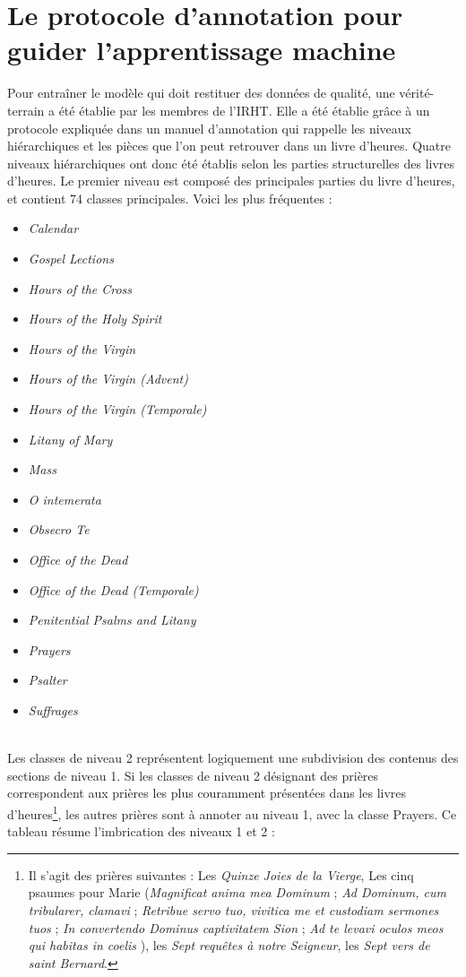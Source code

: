 \documentclass[a4paper,12pt,twoside]{book}
\begin{document}
	\section{\label{protocole_annotation}Le protocole d’annotation pour guider l’apprentissage machine}
	
	Pour entraîner le modèle qui doit restituer des données de qualité, une vérité-terrain a été établie par les membres de l'IRHT. Elle a été établie grâce à un protocole expliquée dans un manuel d'annotation qui rappelle les niveaux hiérarchiques et les pièces que l'on peut retrouver dans un livre d'heures. Quatre niveaux hiérarchiques ont donc été établis selon les parties structurelles des livres d'heures. Le premier niveau est composé des principales parties du livre d'heures, et contient 74 classes principales. Voici les plus fréquentes :
	\begin{itemize}
	    \item \textit{Calendar}
        \item \textit{Gospel Lections}
        \item \textit{Hours of the Cross}
        \item \textit{Hours of the Holy Spirit}
        \item \textit{Hours of the Virgin}
        \item \textit{Hours of the Virgin (Advent)}
        \item \textit{Hours of the Virgin (Temporale)}
        \item \textit{Litany of Mary}
        \item \textit{Mass}
        \item \textit{O intemerata}
        \item \textit{Obsecro Te}
        \item \textit{Office of the Dead}
        \item \textit{Office of the Dead (Temporale)}
        \item \textit{Penitential Psalms and Litany}
        \item \textit{Prayers}
        \item \textit{Psalter}
        \item \textit{Suffrages}
	\end{itemize} 
	\\
	
	
	Les classes de niveau 2 représentent logiquement une subdivision des contenus des sections de niveau 1. Si les classes de niveau 2 désignant des prières correspondent aux prières les plus couramment présentées dans les livres d’heures\footnote{Il s'agit des prières suivantes : Les \textit{Quinze Joies de la Vierge}, Les cinq psaumes pour Marie (\og \textit{Magnificat anima mea Dominum }\fg{} ; \of \textit{Ad Dominum, cum tribularer, clamavi}\fg{} ; \og \textit{Retribue servo tuo, vivitica me et custodiam sermones tuos }\fg{} ; \og \textit{In convertendo Dominus captivitatem Sion }\fg{} ; \og \textit{Ad te levavi oculos meos qui habitas in coelis }\fg{}), les \textit{Sept requêtes à notre Seigneur}, les \textit{Sept vers de saint Bernard}.}, les autres prières sont à annoter au niveau 1, avec la classe \og Prayers\fg{}. Ce tableau résume l'imbrication des niveaux 1 et 2 : 
\end{document}
